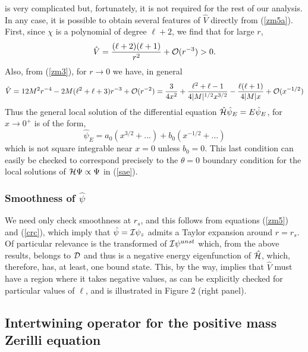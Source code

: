 \documentclass[aps,floats,showpacs,amssymb,tightenlines]{revtex4}
\def\I{{\cal I}}
\begin{document}
is very complicated but, fortunately, it is not required for the rest of our analysis.
In any case, it is possible to obtain several features of $\hat V$ directly from  (\ref{zm5a}). First, since $\chi$ is a polynomial of degree $\ell+2$,  we find that for large $r$,
\begin{equation}\label{zm11a}
\hat V = \frac{(\ell+2)(\ell+1)}{r^2} + {\cal{O}}(r^{-3}) > 0.
\end{equation}
 Also,
from (\ref{zm3}), for $r \to 0$ we have, in general
\begin{equation}\label{zm11}
\hat V = 12 M^2 r^{-4} -2 M (\ell^2+\ell+3) r^{-3} +{\cal{O}}(r^{-2})
= \frac{3}{4 x^2} +\frac{\ell^2+\ell-1}{4|M|^{1/2}x^{3/2}} -\frac{\ell(\ell+1)}{4 |M|x} +{\cal{O}}(x^{-1/2})
\end{equation}
Thus the general local solution of the differential equation $\hat {\cal H} \hat \psi_E = E \hat \psi_E$, for $x \to 0^+$ is of the form,
\begin{equation}
\hat \psi_E = a_0 \left( x^{3/2} + ... \right)  + b_0 \left(  x^{-1/2} + ... \right)
\end{equation}
which is not square integrable near $x=0$ unless $b_0=0$. This last condition
can easily be checked to correspond
 precisely to the $\theta=0$ boundary condition for the local solutions of ${\cal H} \Psi \propto \Psi$ in (\ref{sae}).

\subsubsection{Smoothness of $\hat \psi$}

We need only check smoothness at $r_s$, and this follows from  equations (\ref{zm5}) and (\ref{crc}),
 which imply that $\hat \psi = \I \psi_z$ admits a Taylor
expansion around $r=r_s$.
Of particular relevance is the transformed of $\I \psi^{unst}$ which, from the above results, belongs to ${\cal D}$ and thus is a
negative energy eigenfunction of $\hat {\cal H}$, which, therefore, has, at least, one bound state.
This, by the way, implies that $\hat V$ must have a region where it takes negative values, as can be explicitly checked for particular
 values of $\ell$, and is illustrated in Figure 2 (right panel).\\



\subsection{Intertwining operator for the positive mass Zerilli equation}
\end{document}
